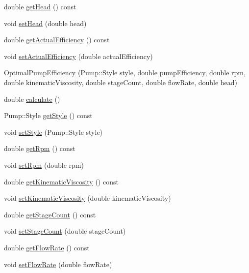 \begin{DoxyCompactItemize}
\item 
double \hyperlink{class_optimal_pump_efficiency_af31fdb10aabc197ff7536c9bbe006573}{get\+Head} () const
\item 
void \hyperlink{class_optimal_pump_efficiency_ac317c900ec68797cf051977147ea33da}{set\+Head} (double head)
\item 
double \hyperlink{class_optimal_pump_efficiency_aa2ac8a7c61bc28f82e30cb44b9c21008}{get\+Actual\+Efficiency} () const
\item 
void \hyperlink{class_optimal_pump_efficiency_a539b20c53c7ba6a5983a60d74be4ac9e}{set\+Actual\+Efficiency} (double actual\+Efficiency)
\item 
\hyperlink{class_optimal_pump_efficiency_a5bc186f1a2bc5457a13d8d5aa4626d08}{Optimal\+Pump\+Efficiency} (Pump\+::\+Style style, double pump\+Efficiency, double rpm, double kinematic\+Viscosity, double stage\+Count, double flow\+Rate, double head)
\item 
double \hyperlink{class_optimal_pump_efficiency_ac40720d1fcdf40d8b364df37e58e7f4d}{calculate} ()
\item 
Pump\+::\+Style \hyperlink{class_optimal_pump_efficiency_a601fe15e9acc23112743fabe417030fb}{get\+Style} () const
\item 
void \hyperlink{class_optimal_pump_efficiency_ab6b85c8c08d6641c5375c65436f16a2f}{set\+Style} (Pump\+::\+Style style)
\item 
double \hyperlink{class_optimal_pump_efficiency_a58e8a430ced612e0518abd07fb30b085}{get\+Rpm} () const
\item 
void \hyperlink{class_optimal_pump_efficiency_afc6b6f46b4e289efc8819249ad1c9fb5}{set\+Rpm} (double rpm)
\item 
double \hyperlink{class_optimal_pump_efficiency_a8c2f7fcacce2b42ed83f29aec2d4671e}{get\+Kinematic\+Viscosity} () const
\item 
void \hyperlink{class_optimal_pump_efficiency_a00017e0bd100beb2f4b0bf2db5e3687f}{set\+Kinematic\+Viscosity} (double kinematic\+Viscosity)
\item 
double \hyperlink{class_optimal_pump_efficiency_aac0c1a4a6492bf00b245c2a61d100eaa}{get\+Stage\+Count} () const
\item 
void \hyperlink{class_optimal_pump_efficiency_a5b0b2a24a87c1c8fc92aa96c6ba4b727}{set\+Stage\+Count} (double stage\+Count)
\item 
double \hyperlink{class_optimal_pump_efficiency_a77c6618681b0fd3a0fc02dc49d16ee99}{get\+Flow\+Rate} () const
\item 
void \hyperlink{class_optimal_pump_efficiency_a90067b57c559fd3274fb8d6e00f6221d}{set\+Flow\+Rate} (double flow\+Rate)

\end{DoxyCompactItemize}
